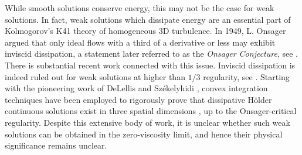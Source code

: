 \documentclass[reqno,12pt]{amsart}
\begin{document}
While smooth solutions conserve energy, this may not be the case for weak solutions. In fact, weak solutions which dissipate energy are an essential part of Kolmogorov's K41 theory of homogeneous 3D turbulence. In 1949, L. Onsager argued that only ideal flows with a third of a derivative or less may exhibit inviscid dissipation, a statement later referred to as the {\it Onsager Conjecture}, see \cite{Kolmogorov41a,Kolmogorov41b,Frisch1995,ES2006}. There is substantial recent work connected with this issue. Inviscid dissipation is indeed ruled out for weak solutions at higher than $1/3$ regularity, see \cite{CET1994,CCFS08}. Starting with the pioneering work of DeLellis and Székelyhidi \cite{LS2009}, convex integration techniques have been employed to rigorously prove that dissipative Hölder continuous solutions exist in three spatial dimensions \cite{DS2017,Isett2018,BLSV2019}, up to the Onsager-critical regularity. Despite this extensive body of work, it is unclear whether such weak solutions can be obtained in the zero-viscosity limit, and hence their physical significance remains unclear.


\end{document}
